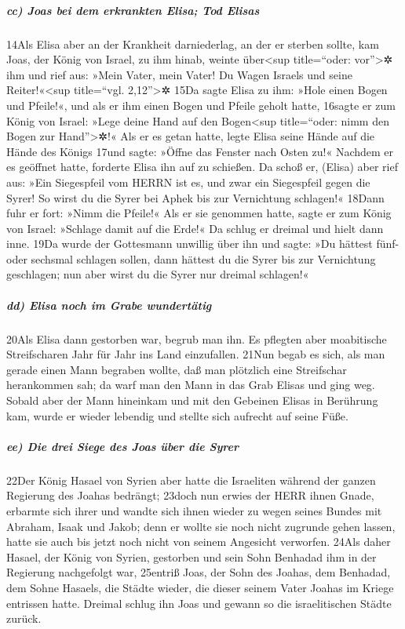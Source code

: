 \hypertarget{cc-joas-bei-dem-erkrankten-elisa-tod-elisas}{%
\subparagraph{cc) Joas bei dem erkrankten Elisa; Tod
Elisas}\label{cc-joas-bei-dem-erkrankten-elisa-tod-elisas}}

14Als Elisa aber an der Krankheit darniederlag, an der er sterben
sollte, kam Joas, der König von Israel, zu ihm hinab, weinte
über\textless sup title=``oder: vor''\textgreater✲ ihm und rief aus:
»Mein Vater, mein Vater! Du Wagen Israels und seine
Reiter!«\textless sup title=``vgl. 2,12''\textgreater✲ 15Da sagte Elisa
zu ihm: »Hole einen Bogen und Pfeile!«, und als er ihm einen Bogen und
Pfeile geholt hatte, 16sagte er zum König von Israel: »Lege deine Hand
auf den Bogen\textless sup title=``oder: nimm den Bogen zur
Hand''\textgreater✲!« Als er es getan hatte, legte Elisa seine Hände auf
die Hände des Königs 17und sagte: »Öffne das Fenster nach Osten zu!«
Nachdem er es geöffnet hatte, forderte Elisa ihn auf zu schießen. Da
schoß er, (Elisa) aber rief aus: »Ein Siegespfeil vom HERRN ist es, und
zwar ein Siegespfeil gegen die Syrer! So wirst du die Syrer bei Aphek
bis zur Vernichtung schlagen!« 18Dann fuhr er fort: »Nimm die Pfeile!«
Als er sie genommen hatte, sagte er zum König von Israel: »Schlage damit
auf die Erde!« Da schlug er dreimal und hielt dann inne. 19Da wurde der
Gottesmann unwillig über ihn und sagte: »Du hättest fünf- oder sechsmal
schlagen sollen, dann hättest du die Syrer bis zur Vernichtung
geschlagen; nun aber wirst du die Syrer nur dreimal schlagen!«

\hypertarget{dd-elisa-noch-im-grabe-wundertuxe4tig}{%
\subparagraph{dd) Elisa noch im Grabe
wundertätig}\label{dd-elisa-noch-im-grabe-wundertuxe4tig}}

20Als Elisa dann gestorben war, begrub man ihn. Es pflegten aber
moabitische Streifscharen Jahr für Jahr ins Land einzufallen. 21Nun
begab es sich, als man gerade einen Mann begraben wollte, daß man
plötzlich eine Streifschar herankommen sah; da warf man den Mann in das
Grab Elisas und ging weg. Sobald aber der Mann hineinkam und mit den
Gebeinen Elisas in Berührung kam, wurde er wieder lebendig und stellte
sich aufrecht auf seine Füße.

\hypertarget{ee-die-drei-siege-des-joas-uxfcber-die-syrer}{%
\subparagraph{ee) Die drei Siege des Joas über die
Syrer}\label{ee-die-drei-siege-des-joas-uxfcber-die-syrer}}

22Der König Hasael von Syrien aber hatte die Israeliten während der
ganzen Regierung des Joahas bedrängt; 23doch nun erwies der HERR ihnen
Gnade, erbarmte sich ihrer und wandte sich ihnen wieder zu wegen seines
Bundes mit Abraham, Isaak und Jakob; denn er wollte sie noch nicht
zugrunde gehen lassen, hatte sie auch bis jetzt noch nicht von seinem
Angesicht verworfen. 24Als daher Hasael, der König von Syrien, gestorben
und sein Sohn Benhadad ihm in der Regierung nachgefolgt war, 25entriß
Joas, der Sohn des Joahas, dem Benhadad, dem Sohne Hasaels, die Städte
wieder, die dieser seinem Vater Joahas im Kriege entrissen hatte.
Dreimal schlug ihn Joas und gewann so die israelitischen Städte zurück.

